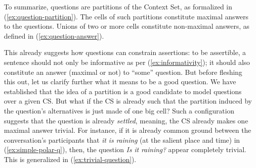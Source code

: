 To summarize, questions are partitions of the Context Set, as formalized in (\ref{ex:question-partition}). The cells of such partitions constitute maximal answers to the questions. Unions of two or more cells constitute non-maximal answers, as defined in (\ref{ex:question-answer}).

\begin{exe}
	\label{ex:question-partition}
	\label{ex:question-answer}
\end{exe}

This already suggests how questions can constrain assertions: to be assertible, a sentence should not only be informative as per (\ref{ex:informativity}); it should also constitute an answer (maximal or not) to ``some'' question. But before fleshing this out, let us clarify further what it means to be a good question. We have established that the idea of a partition is a good candidate to model questions over a given CS. But what if the CS is already such that the partition induced by the question's alternatives is just made of one big cell? Such a configuration suggests that the question is already \textit{settled}, meaning, the CS already makes one maximal answer trivial. For instance, if it is already common ground between the conversation's participants that \textit{it is raining} (at the salient place and time) in (\ref{ex:simple-polar-q}), then, the question \textit{Is it raining?} appear completely trivial. This is generalized in (\ref{ex:trivial-question}).

